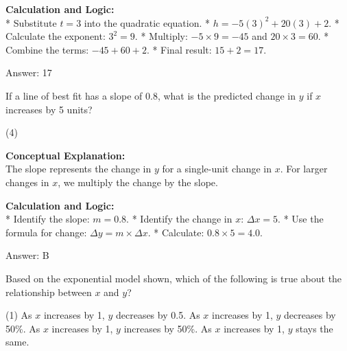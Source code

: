 \documentclass[11pt,paper=a4,answers]{exam}
\begin{document}
\begin{questions}
\begin{solution}
\textbf{Calculation and Logic:} \\
* Substitute $t = 3$ into the quadratic equation.
* $h = -5(3)^2 + 20(3) + 2$.
* Calculate the exponent: $3^2 = 9$.
* Multiply: $-5 \times 9 = -45$ and $20 \times 3 = 60$.
* Combine the terms: $-45 + 60 + 2$.
* Final result: $15 + 2 = 17$.

\vspace{30pt}

Answer: \colorbox{yellow!100}{17}
\end{solution}

\vspace{60pt}

\question
If a line of best fit has a slope of 0.8, what is the predicted change in $y$ if $x$ increases by 5 units?
\begin{tasks}(4)
\end{tasks}

\begin{solution}
\textbf{Conceptual Explanation:} \\
The slope represents the change in $y$ for a single-unit change in $x$. For larger changes in $x$, we multiply the change by the slope.

\vspace{30pt}

\textbf{Calculation and Logic:} \\
* Identify the slope: $m = 0.8$.
* Identify the change in $x$: $\Delta x = 5$.
* Use the formula for change: $\Delta y = m \times \Delta x$.
* Calculate: $0.8 \times 5 = 4.0$.

\vspace{30pt}

Answer: \colorbox{yellow!100}{B}
\end{solution}

\vspace{60pt}

\question
\begin{center}
\end{center}
Based on the exponential model shown, which of the following is true about the relationship between $x$ and $y$?
\begin{tasks}(1)
    \task As $x$ increases by 1, $y$ decreases by 0.5.
    \task As $x$ increases by 1, $y$ decreases by 50\%.
    \task As $x$ increases by 1, $y$ increases by 50\%.
    \task As $x$ increases by 1, $y$ stays the same.
\end{tasks}


\end{questions}
\end{document}
